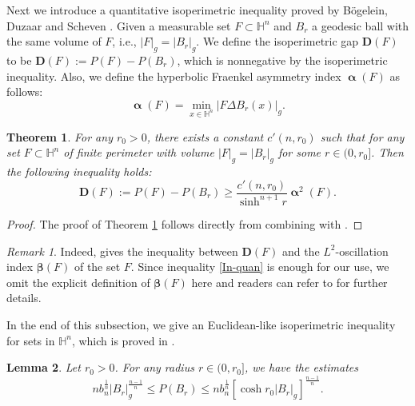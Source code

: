 \documentclass[11pt,reqno]{amsart}
\newtheorem{thm}{Theorem}[section]
\newtheorem{lem}[thm]{Lemma}
\theoremstyle{definition}
\theoremstyle{remark}
\newtheorem{rem}{Remark}
\numberwithin{equation}{section}
\renewcommand{\(}{\left(}
\renewcommand{\)}{\right)}
\renewcommand{\-}{\overline}
\begin{document}
Next we introduce a quantitative isoperimetric inequality proved by Bögelein, Duzaar and Scheven \cite{Bogelein15}. Given a measurable set $F\subset\mathbb{H}^n$ and $B_r$ a geodesic ball with the same volume of $F$, i.e., $|F|_g=|B_r|_g$. We define the isoperimetric gap $\mathbf{D}(F)$ to be $\mathbf{D}(F):=P(F)-P(B_r)$, which is nonnegative by the isoperimetric inequality. Also, we define the
hyperbolic Fraenkel asymmetry index $\bm{\upalpha}(F)$ as follows:
\begin{equation}\label{Defn-asym}
	\bm{\upalpha}(F)=\min_{x\in\mathbb{H}^n}|F\Delta B_r(x)|_g.
\end{equation}
\begin{thm}\label{Thm-quan}
	For any $r_0>0$, there exists a constant $c'(n,r_0)$ such that for any set $F\subset\mathbb{H}^n$ of finite perimeter with volume $|F|_g=|B_r|_g$ for some $r\in(0,r_0]$. Then the following inequality holds:
	\begin{equation}\label{In-quan}
	\mathbf{D}(F):=P(F)-P(B_r)\geq \frac{c'(n,r_0)}{\sinh^{n+1} r}\bm{\upalpha}^2(F).
	\end{equation}
\end{thm}
\begin{proof}
	The proof of Theorem \ref{Thm-quan} follows directly from combining \cite[Theorem 1.1]{Bogelein15} with \cite[Equation (1.6)]{Bogelein15}.
\end{proof}
\begin{rem}
	Indeed, \cite[Theorem 1.1]{Bogelein15} gives the inequality between $\mathbf{D}(F)$ and the $L^2$-oscillation index $\bm{\beta}(F)$ of the set $F$. Since inequality \eqref{In-quan} is enough for our use, we omit the explicit definition of $\bm{\beta}(F)$ here and readers can refer to \cite[\S 2.6]{Bogelein15} for further details.
\end{rem}
In the end of this subsection, we give an Euclidean-like isoperimetric inequality for sets in $\mathbb{H}^n$, which is proved in \cite[Lemma 2.1]{Bogelein15}.
\begin{lem}\label{Lem-Eulik}
	Let $r_0>0$. For any radius $r\in(0,r_0]$, we have the estimates 
	\begin{equation}\label{In-Eulik}
		nb_n^{\frac{1}{n}}|B_r|_g^{\frac{n-1}{n}}\leq P(B_r)\leq n b_n^{\frac{1}{n}}\left[\cosh{r_0}|B_r|_g\right]^{\frac{n-1}{n}}.
	\end{equation}
\end{lem}
\end{document}
